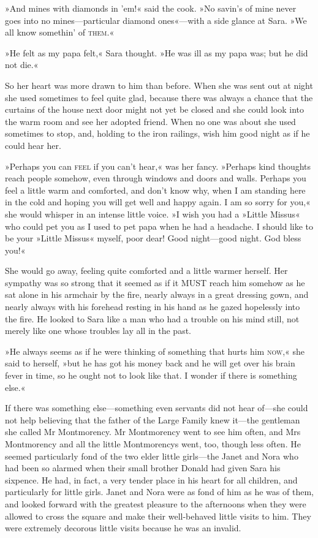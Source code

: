 »And mines with diamonds in 'em!« said the cook. »No savin's of mine never goes into no mines—particular diamond ones«—with a side glance at Sara. »We all know somethin' of \textsc{them}.«

»He felt as my papa felt,« Sara thought. »He was ill as my papa was; but he did not die.«

So her heart was more drawn to him than before. When she was sent out at night she used sometimes to feel quite glad, because there was always a chance that the curtains of the house next door might not yet be closed and she could look into the warm room and see her adopted friend. When no one was about she used sometimes to stop, and, holding to the iron railings, wish him good night as if he could hear her.

»Perhaps you can \textsc{feel} if you can't hear,« was her fancy. »Perhaps kind thoughts reach people somehow, even through windows and doors and walls. Perhaps you feel a little warm and comforted, and don't know why, when I am standing here in the cold and hoping you will get well and happy again. I am so sorry for you,« she would whisper in an intense little voice. »I wish you had a »Little Missus« who could pet you as I used to pet papa when he had a headache. I should like to be your »Little Missus« myself, poor dear! Good night—good night. God bless you!«

She would go away, feeling quite comforted and a little warmer herself. Her sympathy was so strong that it seemed as if it MUST reach him somehow as he sat alone in his armchair by the fire, nearly always in a great dressing gown, and nearly always with his forehead resting in his hand as he gazed hopelessly into the fire. He looked to Sara like a man who had a trouble on his mind still, not merely like one whose troubles lay all in the past.

»He always seems as if he were thinking of something that hurts him \textsc{now},« she said to herself, »but he has got his money back and he will get over his brain fever in time, so he ought not to look like that. I wonder if there is something else.«

If there was something else—something even servants did not hear of—she could not help believing that the father of the Large Family knew it—the gentleman she called Mr Montmorency. Mr Montmorency went to see him often, and Mrs Montmorency and all the little Montmorencys went, too, though less often. He seemed particularly fond of the two elder little girls—the Janet and Nora who had been so alarmed when their small brother Donald had given Sara his sixpence. He had, in fact, a very tender place in his heart for all children, and particularly for little girls. Janet and Nora were as fond of him as he was of them, and looked forward with the greatest pleasure to the afternoons when they were allowed to cross the square and make their well-behaved little visits to him. They were extremely decorous little visits because he was an invalid.

